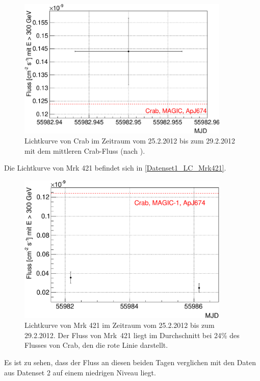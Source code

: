 \begin{figure}
    \centering
    \includegraphics[width=0.9\textwidth]{./Plots/04_MrkAnalyse/Datenset1/Datenset1_LC_Crab.pdf}
    \caption{Lichtkurve von Crab im Zeitraum vom 25.2.2012 bis zum 29.2.2012 mit dem mittleren Crab-Fluss (nach \cite{LiteraturreferenzMAGIC}).}
    \label{Datenset1_LC_Crab}
\end{figure}

Die Lichtkurve von Mrk 421 befindet sich in \autoref{Datenset1_LC_Mrk421}.

\begin{figure}
    \centering
    \includegraphics[width=0.9\textwidth]{./Plots/04_MrkAnalyse/Datenset1/Datenset1_LC_Mrk421.pdf}
    \caption{Lichtkurve von Mrk 421 im Zeitraum vom 25.2.2012 bis zum 29.2.2012.
    Der Fluss von Mrk~421 liegt im Durchschnitt bei 24\% des Flusses von Crab, den die rote Linie darstellt.}
    \label{Datenset1_LC_Mrk421}
\end{figure}

Es ist zu sehen, dass der Fluss an diesen beiden Tagen verglichen mit den Daten aus Datenset 2 auf einem niedrigen Niveau liegt.



